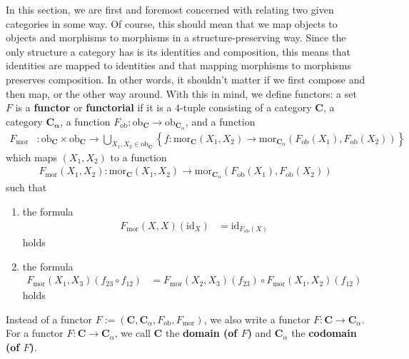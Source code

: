In this section, we are first and foremost concerned with relating two given categories in some way.
Of course, this should mean that we map objects to objects and morphisms to morphisms in a structure-preserving way.
Since the only structure a category has is its identities and composition, this means that identities are mapped to identities and that mapping morphisms to morphisms preserves composition.
In other words, it shouldn't matter if we first compose and then map, or the other way around.
With this in mind, we define functors: a set $F$ is a \textbf{functor} or \textbf{functorial} if it is a $4$-tuple consisting of a category $\mathbf{C}$, a category $\mathbf{C_{\alpha}}$, a function $F_{\mathrm{ob}} \colon \mathrm{ob}_{\mathbf{C}} \rightarrow \mathrm{ob}_{\mathbf{C}_{\alpha}}$, and a function
\begin{align*}
  F_{\mathrm{mor}}
  &\colon
  \mathrm{ob}_{\mathbf{C}}
  \times
  \mathrm{ob}_{\mathbf{C}}
  \rightarrow
  \bigcup_{X_{1},X_{2} \in \mathrm{ob}_{\mathbf{C}}}
  \left\lbrace
    f
    \colon
    \mathrm{mor}_{\mathbf{C}}(X_{1},X_{2})
    \rightarrow
    \mathrm{mor}_{\mathbf{C}_{\alpha}}
    (F_{\mathrm{ob}}(X_{1}),F_{\mathrm{ob}}(X_{2}))
  \right\rbrace
\end{align*}
which maps $(X_{1},X_{2})$ to a function
\begin{align*}
  F_{\mathrm{mor}}(X_{1},X_{2})
  \colon
  \mathrm{mor}_{\mathbf{C}}(X_{1},X_{2})
  \rightarrow
  \mathrm{mor}_{\mathbf{C}_{\alpha}}
  (F_{\mathrm{ob}}(X_{1}),F_{\mathrm{ob}}(X_{2}))
\end{align*}
such that
\begin{enumerate}
\item[(F1)]
the formula
\begin{align*}
  F_{\mathrm{mor}}(X,X)(\mathrm{id}_{X})
  &=
  \mathrm{id}_{F_{\mathrm{ob}}(X)}
\end{align*}
holds
\item[(F2)]
the formula
\begin{align*}
  F_{\mathrm{mor}}(X_{1},X_{3})(f_{23} \circ f_{12})
  &=
  F_{\mathrm{mor}}(X_{2},X_{3})(f_{23})
  \circ
  F_{\mathrm{mor}}(X_{1},X_{2})(f_{12})
\end{align*}  
holds
\end{enumerate}
Instead of {\glqq}a functor $F := (\mathbf{C},\mathbf{C}_{\alpha},F_{\mathrm{ob}},F_{\mathrm{mor}})${\grqq}, we also write {\glqq}a functor $F \colon \mathbf{C} \rightarrow \mathbf{C}_{\alpha}${\grqq}.
For a functor $F \colon \mathbf{C} \rightarrow \mathbf{C}_{\alpha}$, we call $\mathbf{C}$ the \textbf{domain (of $F$)} and $\mathbf{C}_{\alpha}$ the \textbf{codomain (of $F$)}.
